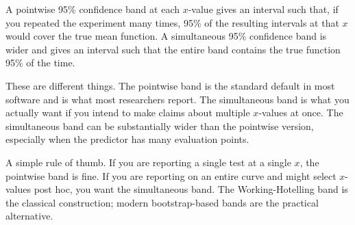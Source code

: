 \documentclass[
  letterpaper,
  11pt,
  twoside,
  openany]{scrbook}
\begin{document}
\begin{tcolorbox}[enhanced jigsaw, arc=.35mm, bottomrule=.15mm, bottomtitle=1mm, breakable, colback=white, colbacktitle=quarto-callout-note-color!10!white, colframe=quarto-callout-note-color-frame, coltitle=black, left=2mm, leftrule=.75mm, opacityback=0, opacitybacktitle=0.6, rightrule=.15mm, title=\textcolor{quarto-callout-note-color}{\faInfo}\hspace{0.5em}{Inside the math: pointwise vs simultaneous bands}, titlerule=0mm, toprule=.15mm, toptitle=1mm]

A pointwise 95\% confidence band at each \(x\)-value gives an interval
such that, if you repeated the experiment many times, 95\% of the
resulting intervals at that \(x\) would cover the true mean function. A
simultaneous 95\% confidence band is wider and gives an interval such
that the entire band contains the true function 95\% of the time.

These are different things. The pointwise band is the standard default
in most software and is what most researchers report. The simultaneous
band is what you actually want if you intend to make claims about
multiple \(x\)-values at once. The simultaneous band can be
substantially wider than the pointwise version, especially when the
predictor has many evaluation points.

A simple rule of thumb. If you are reporting a single test at a single
\(x\), the pointwise band is fine. If you are reporting on an entire
curve and might select \(x\)-values post hoc, you want the simultaneous
band. The Working-Hotelling band is the classical construction; modern
bootstrap-based bands are the practical alternative.

\end{tcolorbox}
\end{document}
